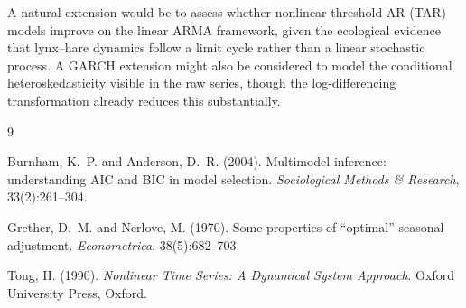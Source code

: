\documentclass[12pt,a4paper]{article}
\begin{document}
A natural extension would be to assess whether nonlinear threshold AR (TAR) models
\citep{tong1990nonlinear} improve on the linear ARMA framework, given the ecological
evidence that lynx--hare dynamics follow a limit cycle rather than a linear stochastic
process. A GARCH extension might also be considered to model the conditional
heteroskedasticity visible in the raw series, though the log-differencing
transformation already reduces this substantially.

\newpage

\begin{thebibliography}{9}

Burnham, K.~P. and Anderson, D.~R. (2004).
\newblock Multimodel inference: understanding AIC and BIC in model selection.
\newblock \textit{Sociological Methods \& Research}, 33(2):261--304.

Grether, D.~M. and Nerlove, M. (1970).
\newblock Some properties of ``optimal'' seasonal adjustment.
\newblock \textit{Econometrica}, 38(5):682--703.

Tong, H. (1990).
\newblock \textit{Nonlinear Time Series: A Dynamical System Approach}.
\newblock Oxford University Press, Oxford.

\end{thebibliography}
\end{document}
